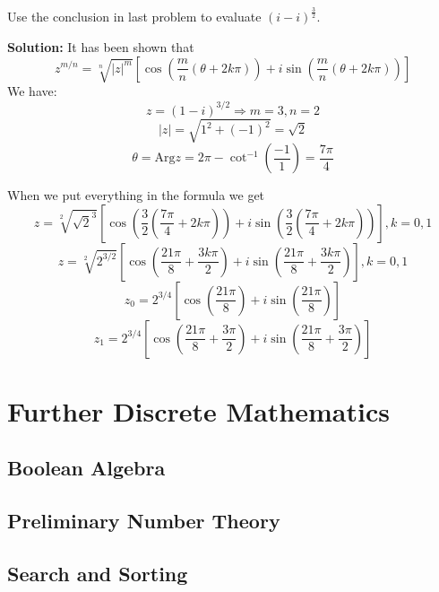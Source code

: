 \documentclass[
	12pt, %
	fleqn, %
	a4paper, %
]{LegrandOrangeBook}
\begin{document}
\begin{exercise}
    Use the conclusion in last problem to evaluate $(i-i)^\frac{3}{2}$.
\end{exercise}
\textbf{Solution:}
It has been shown that
\begin{equation}
    \boxed{ z^{m/n} = \sqrt[n]{|z|^m}\left[\cos\left(\frac{m}{n}(\theta + 2k\pi)\right) + i\sin\left(\frac{m}{n}(\theta + 2k\pi)\right)\right]}
\end{equation}
We have:
\[ z = (1 - i)^{3/2} \Rightarrow m = 3, n = 2 \]
\[ |z| = \sqrt{1^2 + (-1)^2} = \sqrt{2} \]
\[ \theta = \text{Arg} z = 2\pi - \cot^{-1}\left(\frac{-1}{1}\right) = \frac{7\pi}{4} \]

When we put everything in the formula we get
\[ z = \sqrt[2]{\sqrt{2}^3}\left[\cos\left(\frac{3}{2}\left(\frac{7\pi}{4} + 2k\pi\right)\right) + i\sin\left(\frac{3}{2}\left(\frac{7\pi}{4} + 2k\pi\right)\right)\right], k = 0, 1 \]
\[ z = \sqrt[2]{2^{3/2}}\left[\cos\left(\frac{21\pi}{8} + \frac{3k\pi}{2}\right) + i\sin\left(\frac{21\pi}{8} + \frac{3k\pi}{2}\right)\right], k = 0, 1 \]
\[ z_0 = 2^{3/4}\left[\cos\left(\frac{21\pi}{8}\right) + i\sin\left(\frac{21\pi}{8}\right)\right] \]
\[ z_1 = 2^{3/4}\left[\cos\left(\frac{21\pi}{8} + \frac{3\pi}{2}\right) + i\sin\left(\frac{21\pi}{8} + \frac{3\pi}{2}\right)\right] \]
\part{Further Discrete Mathematics}


\chapterspaceabove{6.75cm} 
\chapterspacebelow{7.25cm} 
\chapter{Boolean Algebra}

\chapterspaceabove{6.75cm} 
\chapterspacebelow{7.25cm} 
\chapter{Preliminary Number Theory}
\chapterspaceabove{6.75cm} 
\chapterspacebelow{7.25cm} 
\chapter{Search and Sorting}
\chapterspaceabove{6.75cm} 
\chapterspacebelow{7.25cm} 
\end{document}
